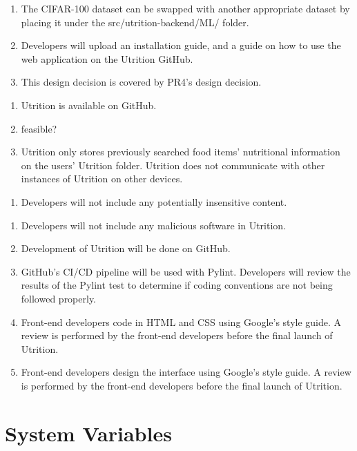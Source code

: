 \documentclass[12pt, titlepage]{article}
\begin{document}
\begin{enumerate}[{MS}1. ]
	\item The CIFAR-100 dataset can be swapped with another appropriate dataset by placing it under the src/utrition-backend/ML/ folder.
	\item Developers will upload an installation guide, and a guide on how to use the web application on the Utrition GitHub.
	\item This design decision is covered by PR4's design decision.
\end{enumerate}

\begin{enumerate}[{SR}1. ]
	\item Utrition is available on GitHub.
	\item feasible?
	\item Utrition only stores previously searched food items’ nutritional information on the users’ Utrition folder. Utrition does not communicate with other instances of Utrition on other devices.
\end{enumerate}

\begin{enumerate}[{CP}1. ]
	\item Developers will not include any potentially insensitive content.
\end{enumerate}	

\begin{enumerate}[{LR}1. ]
	\item Developers will not include any malicious software in Utrition.
	\item Development of Utrition will be done on GitHub.
	\item GitHub’s CI/CD pipeline will be used with Pylint. Developers will review the results of the Pylint test to determine if coding conventions are not being followed properly.
	\item Front-end developers code in HTML and CSS using Google’s style guide. A review is performed by the front-end developers before the final launch of Utrition.
	\item Front-end developers design the interface using Google’s style guide. A review is performed by the front-end developers before the final launch of Utrition.
\end{enumerate}	
\section{System Variables}
\end{document}
